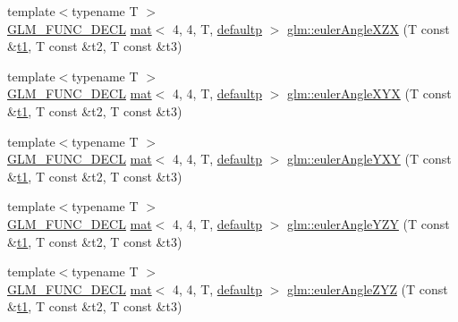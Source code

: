 \begin{DoxyCompactItemize}
\item 
{\footnotesize template$<$typename T $>$ }\\\hyperlink{setup_8hpp_ab2d052de21a70539923e9bcbf6e83a51}{G\+L\+M\+\_\+\+F\+U\+N\+C\+\_\+\+D\+E\+CL} \hyperlink{structglm_1_1mat}{mat}$<$ 4, 4, T, \hyperlink{namespaceglm_a36ed105b07c7746804d7fdc7cc90ff25a9d21ccd8b5a009ec7eb7677befc3bf51}{defaultp} $>$ \hyperlink{group__gtx__euler__angles_ga60171c79a17aec85d7891ae1d1533ec9}{glm\+::euler\+Angle\+X\+ZX} (T const \&\hyperlink{_s_d_l__opengl__glext_8h_af48031a37b713afa3b0d0d7d29653d7c}{t1}, T const \&t2, T const \&t3)
\item 
{\footnotesize template$<$typename T $>$ }\\\hyperlink{setup_8hpp_ab2d052de21a70539923e9bcbf6e83a51}{G\+L\+M\+\_\+\+F\+U\+N\+C\+\_\+\+D\+E\+CL} \hyperlink{structglm_1_1mat}{mat}$<$ 4, 4, T, \hyperlink{namespaceglm_a36ed105b07c7746804d7fdc7cc90ff25a9d21ccd8b5a009ec7eb7677befc3bf51}{defaultp} $>$ \hyperlink{group__gtx__euler__angles_ga29bd0787a28a6648159c0d6e69706066}{glm\+::euler\+Angle\+X\+YX} (T const \&\hyperlink{_s_d_l__opengl__glext_8h_af48031a37b713afa3b0d0d7d29653d7c}{t1}, T const \&t2, T const \&t3)
\item 
{\footnotesize template$<$typename T $>$ }\\\hyperlink{setup_8hpp_ab2d052de21a70539923e9bcbf6e83a51}{G\+L\+M\+\_\+\+F\+U\+N\+C\+\_\+\+D\+E\+CL} \hyperlink{structglm_1_1mat}{mat}$<$ 4, 4, T, \hyperlink{namespaceglm_a36ed105b07c7746804d7fdc7cc90ff25a9d21ccd8b5a009ec7eb7677befc3bf51}{defaultp} $>$ \hyperlink{group__gtx__euler__angles_ga750fba9894117f87bcc529d7349d11de}{glm\+::euler\+Angle\+Y\+XY} (T const \&\hyperlink{_s_d_l__opengl__glext_8h_af48031a37b713afa3b0d0d7d29653d7c}{t1}, T const \&t2, T const \&t3)
\item 
{\footnotesize template$<$typename T $>$ }\\\hyperlink{setup_8hpp_ab2d052de21a70539923e9bcbf6e83a51}{G\+L\+M\+\_\+\+F\+U\+N\+C\+\_\+\+D\+E\+CL} \hyperlink{structglm_1_1mat}{mat}$<$ 4, 4, T, \hyperlink{namespaceglm_a36ed105b07c7746804d7fdc7cc90ff25a9d21ccd8b5a009ec7eb7677befc3bf51}{defaultp} $>$ \hyperlink{group__gtx__euler__angles_ga5e5e40abc27630749b42b3327c76d6e4}{glm\+::euler\+Angle\+Y\+ZY} (T const \&\hyperlink{_s_d_l__opengl__glext_8h_af48031a37b713afa3b0d0d7d29653d7c}{t1}, T const \&t2, T const \&t3)
\item 
{\footnotesize template$<$typename T $>$ }\\\hyperlink{setup_8hpp_ab2d052de21a70539923e9bcbf6e83a51}{G\+L\+M\+\_\+\+F\+U\+N\+C\+\_\+\+D\+E\+CL} \hyperlink{structglm_1_1mat}{mat}$<$ 4, 4, T, \hyperlink{namespaceglm_a36ed105b07c7746804d7fdc7cc90ff25a9d21ccd8b5a009ec7eb7677befc3bf51}{defaultp} $>$ \hyperlink{group__gtx__euler__angles_gacd795f1dbecaf74974f9c76bbcca6830}{glm\+::euler\+Angle\+Z\+YZ} (T const \&\hyperlink{_s_d_l__opengl__glext_8h_af48031a37b713afa3b0d0d7d29653d7c}{t1}, T const \&t2, T const \&t3)

\end{DoxyCompactItemize}
